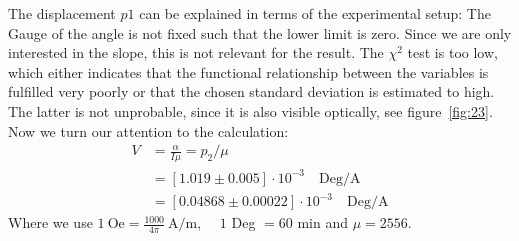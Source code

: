 The displacement $p1$ can be explained in terms of the experimental setup: The Gauge of the 
angle is not fixed such that the lower limit is zero. Since we are only interested in the slope,
this is not relevant for the result. The $\chi^2$ test is too low, which either indicates that
the functional relationship between the variables is fulfilled very poorly or that the chosen
standard deviation is estimated to high. The latter is not unprobable, since it is also
visible optically, see figure~\ref{fig:23}. Now we turn our attention to the calculation:
\begin{align}
    V &= \frac{\alpha}{I\mu}   = p_2 / \mu \\
      &= \left [ 1.019 \pm 0.005 \right ]\cdot 10^{-3} \quad \mathrm{Deg/A} \\
      &= \left [ 0.04868 \pm 0.00022 \right ] \cdot 10^{-3} \quad \mathrm{Deg/A}
\end{align}
Where we use $1\ \mathrm{Oe} = \frac{1000}{4\pi}\ \mathrm{A/m}$, $\quad1$ Deg $=60$ min \quad and $\mu = 2556$.






